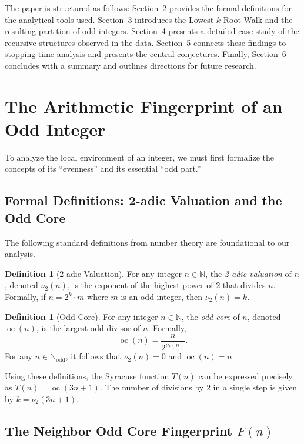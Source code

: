 \documentclass[12pt]{article}
\theoremstyle{plain}
\theoremstyle{definition}
\newtheorem{definition}[theorem]{Definition}
\begin{document}
The paper is structured as follows: Section~2 provides the formal definitions for the analytical tools used. Section~3 introduces the Lowest-$k$ Root Walk and the resulting partition of odd integers. Section~4 presents a detailed case study of the recursive structures observed in the data. Section~5 connects these findings to stopping time analysis and presents the central conjectures. Finally, Section~6 concludes with a summary and outlines directions for future research.

\section{The Arithmetic Fingerprint of an Odd Integer}

To analyze the local environment of an integer, we must first formalize the concepts of its ``evenness'' and its essential ``odd part.''

\subsection{Formal Definitions: 2-adic Valuation and the Odd Core}

The following standard definitions from number theory are foundational to our analysis.

\begin{definition}[2-adic Valuation]
For any integer $n \in \mathbb{N}$, the \emph{2-adic valuation} of $n$, denoted $\nu_2(n)$, is the exponent of the highest power of $2$ that divides $n$. Formally, if $n = 2^k \cdot m$ where $m$ is an odd integer, then $\nu_2(n) = k$.
\end{definition}

\begin{definition}[Odd Core]
For any integer $n \in \mathbb{N}$, the \emph{odd core} of $n$, denoted $\operatorname{oc}(n)$, is the largest odd divisor of $n$. Formally,
\[
\operatorname{oc}(n) = \frac{n}{2^{\nu_2(n)}}.
\]
For any $n \in \mathbb{N}_{\text{odd}}$, it follows that $\nu_2(n) = 0$ and $\operatorname{oc}(n) = n$.
\end{definition}

Using these definitions, the Syracuse function $T(n)$ can be expressed precisely as $T(n) = \operatorname{oc}(3n+1)$. The number of divisions by $2$ in a single step is given by $k = \nu_2(3n+1)$.

\subsection{The Neighbor Odd Core Fingerprint $F(n)$}
\end{document}
